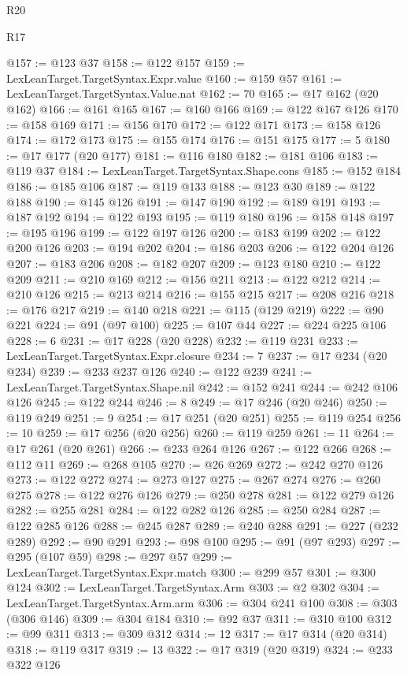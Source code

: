 \begin{lexlean}{R20}
\begin{lexlean}{R17}
\begin{coremodule}
{{{{{{{{{{{{{{{{{{{{{{{{{{{{{{{{{{{{{{{{{{{{{{{{{{{{{{{{{{{{{{{{{{{{{{{{{{{{{{{{{{{{{{{{{{{{{{{{{{{{{{{{{{{@157 := @123 @37
@158 := @122 @157
@159 := LexLeanTarget.TargetSyntax.Expr.value
@160 := @159 @57
@161 := LexLeanTarget.TargetSyntax.Value.nat
@162 := 70
@165 := @17 @162 (@20 @162)
@166 := @161 @165
@167 := @160 @166
@169 := @122 @167 @126
@170 := @158 @169
@171 := @156 @170
@172 := @122 @171
@173 := @158 @126
@174 := @172 @173
@175 := @155 @174
@176 := @151 @175
@177 := 5
@180 := @17 @177 (@20 @177)
@181 := @116 @180
@182 := @181 @106
@183 := @119 @37
@184 := LexLeanTarget.TargetSyntax.Shape.cons
@185 := @152 @184
@186 := @185 @106
@187 := @119 @133
@188 := @123 @30
@189 := @122 @188
@190 := @145 @126
@191 := @147 @190
@192 := @189 @191
@193 := @187 @192
@194 := @122 @193
@195 := @119 @180
@196 := @158 @148
@197 := @195 @196
@199 := @122 @197 @126
@200 := @183 @199
@202 := @122 @200 @126
@203 := @194 @202
@204 := @186 @203
@206 := @122 @204 @126
@207 := @183 @206
@208 := @182 @207
@209 := @123 @180
@210 := @122 @209
@211 := @210 @169
@212 := @156 @211
@213 := @122 @212
@214 := @210 @126
@215 := @213 @214
@216 := @155 @215
@217 := @208 @216
@218 := @176 @217
@219 := @140 @218
@221 := @115 (@129 @219)
@222 := @90 @221
@224 := @91 (@97 @100)
@225 := @107 @44
@227 := @224 @225 @106
@228 := 6
@231 := @17 @228 (@20 @228)
@232 := @119 @231
@233 := LexLeanTarget.TargetSyntax.Expr.closure
@234 := 7
@237 := @17 @234 (@20 @234)
@239 := @233 @237 @126
@240 := @122 @239
@241 := LexLeanTarget.TargetSyntax.Shape.nil
@242 := @152 @241
@244 := @242 @106 @126
@245 := @122 @244
@246 := 8
@249 := @17 @246 (@20 @246)
@250 := @119 @249
@251 := 9
@254 := @17 @251 (@20 @251)
@255 := @119 @254
@256 := 10
@259 := @17 @256 (@20 @256)
@260 := @119 @259
@261 := 11
@264 := @17 @261 (@20 @261)
@266 := @233 @264 @126
@267 := @122 @266
@268 := @112 @11
@269 := @268 @105
@270 := @26 @269
@272 := @242 @270 @126
@273 := @122 @272
@274 := @273 @127
@275 := @267 @274
@276 := @260 @275
@278 := @122 @276 @126
@279 := @250 @278
@281 := @122 @279 @126
@282 := @255 @281
@284 := @122 @282 @126
@285 := @250 @284
@287 := @122 @285 @126
@288 := @245 @287
@289 := @240 @288
@291 := @227 (@232 @289)
@292 := @90 @291
@293 := @98 @100
@295 := @91 (@97 @293)
@297 := @295 (@107 @59)
@298 := @297 @57
@299 := LexLeanTarget.TargetSyntax.Expr.match
@300 := @299 @57
@301 := @300 @124
@302 := LexLeanTarget.TargetSyntax.Arm
@303 := @2 @302
@304 := LexLeanTarget.TargetSyntax.Arm.arm
@306 := @304 @241 @100
@308 := @303 (@306 @146)
@309 := @304 @184
@310 := @92 @37
@311 := @310 @100
@312 := @99 @311
@313 := @309 @312
@314 := 12
@317 := @17 @314 (@20 @314)
@318 := @119 @317
@319 := 13
@322 := @17 @319 (@20 @319)
@324 := @233 @322 @126
}}}}}}}}}}}}}}}}}}}}}}}}}}}}}}}}}}}}}}}}}}}}}}}}}}}}}}}}}}}}}}}}}}}}}}}}}}}}}}}}}}}}}}}}}}}}}}}}}}}}}}}}}}}
\end{coremodule}
\end{lexlean}
\end{lexlean}
